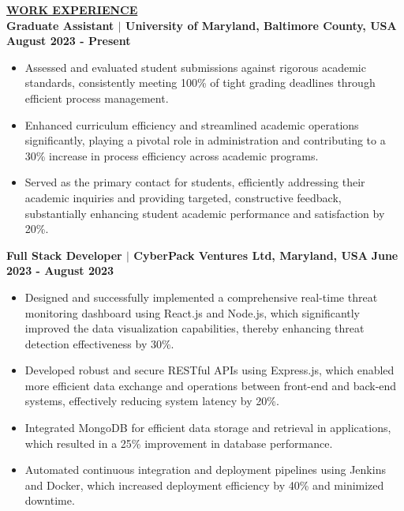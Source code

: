 \documentclass{article}
\begin{document}
\noindent \textbf{\underline{WORK EXPERIENCE}} \\
\noindent \textbf{Graduate Assistant $\mid$ University of Maryland, Baltimore County, USA}  \hfill \textbf{August 2023 - Present}
\begin{itemize}[noitemsep,nolistsep,leftmargin=*]
\item {\small Assessed and evaluated student submissions against rigorous academic standards, consistently meeting 100\% of tight grading deadlines through efficient process management.}
\item {\small Enhanced curriculum efficiency and streamlined academic operations significantly, playing a pivotal role in administration and contributing to a 30\% increase in process efficiency across academic programs.}
\item {\small Served as the primary contact for students, efficiently addressing their academic inquiries and providing targeted, constructive feedback, substantially enhancing student academic performance and satisfaction by 20\%.}
\end{itemize}

\vspace{2mm} 

\noindent \textbf{Full Stack Developer $\mid$ CyberPack Ventures Ltd, Maryland, USA} \hfill \textbf{June 2023 - August 2023}
\begin{itemize}[noitemsep,nolistsep,leftmargin=*]
\item {\small Designed and successfully implemented a comprehensive real-time threat monitoring dashboard using React.js and Node.js, which significantly improved the data visualization capabilities, thereby enhancing threat detection effectiveness by 30\%.}
\item {\small Developed robust and secure RESTful APIs using Express.js, which enabled more efficient data exchange and operations between front-end and back-end systems, effectively reducing system latency by 20\%.}
\item {\small Integrated MongoDB for efficient data storage and retrieval in applications, which resulted in a 25\% improvement in database performance.}
\item {\small Automated continuous integration and deployment pipelines using Jenkins and Docker, which increased deployment efficiency by 40\% and minimized downtime.}
\end{itemize}
\end{document}
